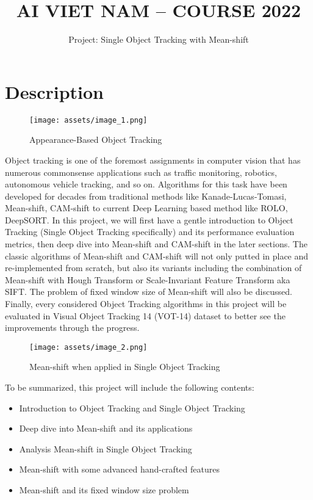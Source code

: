 \documentclass[11pt]{article}
\title{\LARGE AI VIET NAM – COURSE 2022}
\author{\Huge Project: Single Object Tracking with Mean-shift}
\begin{document}
\maketitle

\section*{Description}


\begin{figure}[H]
    \texttt{[image: assets/image\_1.png]}
    \centering
    \caption{Appearance-Based Object Tracking}
    \end{figure}

Object tracking is one of the foremost assignments in computer vision that has numerous commonsense applications such as traffic monitoring, robotics, autonomous vehicle tracking, and so on. Algorithms for this task have been developed for decades from traditional methods like Kanade-Lucas-Tomasi, Mean-shift, CAM-shift to current Deep Learning based method like ROLO,  DeepSORT. In this project, we will first have a gentle introduction to Object Tracking (Single Object Tracking specifically) and its performance evaluation metrics, then deep dive into Mean-shift and CAM-shift in the later sections. The classic algorithms of Mean-shift and CAM-shift will not only putted in place and re-implemented from scratch, but also its variants including the combination of Mean-shift with Hough Transform or Scale-Invariant Feature Transform aka SIFT. The problem of fixed window size of Mean-shift will also be discussed. Finally, every considered Object Tracking algorithms in this project will be evaluated in Visual Object Tracking 14 (VOT-14) dataset to better see the improvements through the progress.

\begin{figure}[H]
    \texttt{[image: assets/image\_2.png]}
    \centering
    \caption{Mean-shift when applied in Single Object Tracking}
\end{figure}

To be summarized, this project will include the following contents:
\begin{itemize}
    \item Introduction to Object Tracking and Single Object Tracking
    \item Deep dive into Mean-shift and its applications
    \item Analysis Mean-shift in Single Object Tracking
    \item Mean-shift with some advanced hand-crafted features
    \item Mean-shift and its fixed window size problem
\end{itemize}
\end{document}
